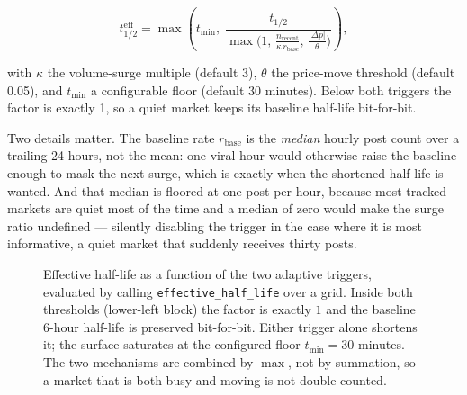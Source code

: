 \documentclass[11pt]{article}
\newcommand{\code}[1]{\texttt{\small #1}}
\begin{document}
\begin{equation}
t_{1/2}^{\text{eff}} = \max\!\left(t_{\min},\;
\frac{t_{1/2}}{\max\big(1,\, \tfrac{n_{\text{recent}}}{\kappa \, r_{\text{base}}},\,
\tfrac{|\Delta p|}{\theta}\big)}\right),
\end{equation}

with $\kappa$ the volume-surge multiple (default 3), $\theta$ the price-move
threshold (default 0.05), and $t_{\min}$ a configurable floor (default 30
minutes). Below both triggers the factor is exactly 1, so a quiet market keeps
its baseline half-life bit-for-bit.

Two details matter. The baseline rate $r_{\text{base}}$ is the \emph{median}
hourly post count over a trailing 24 hours, not the mean: one viral hour would
otherwise raise the baseline enough to mask the next surge, which is exactly
when the shortened half-life is wanted. And that median is floored at one post
per hour, because most tracked markets are quiet most of the time and a median
of zero would make the surge ratio undefined --- silently disabling the trigger
in the case where it is most informative, a quiet market that suddenly receives
thirty posts.

\begin{figure}[htbp]
\centering
{}
\caption[Effective half-life under the two adaptive triggers]{Effective half-life as a function of the two adaptive triggers,
evaluated by calling \code{effective\_half\_life} over a grid. Inside both
thresholds (lower-left block) the factor is exactly $1$ and the baseline 6-hour
half-life is preserved bit-for-bit. Either trigger alone shortens it; the
surface saturates at the configured floor $t_{\min} = 30$ minutes. The two
mechanisms are combined by $\max$, not by summation, so a market that is both
busy and moving is not double-counted.}
\label{fig:halflife}
\end{figure}
\end{document}
